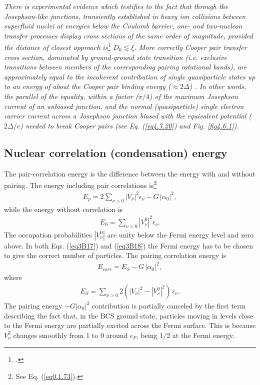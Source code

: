 \textit{There is experimental evidence which testifies to the fact that through the Josephson-like junctions, transiently established in heavy ion collisions between superfluid nuclei at energies below the Coulomb barrier, one- and two-nucleon transfer processes display cross sections of the same order of magnitude, provided the distance of closest approach is\footnote{\cite{Potel:20b}.} $D_0\lesssim\xi$.  More correctly Cooper pair transfer cross section, dominated by ground-ground state transition (i.e. exclusive transitions between members of the corresponding pairing rotational bands), are approximately equal to the incoherent contribution of single quasiparticle states up to an energy of about the Cooper pair binding energy ($\approx2\Delta$) . In other words, the parallel of the equality, within a factor ($\pi/4$) of the maximum Josephson current of an unbiased junction, and the normal (quasiparticle) single electron carrier current across a Josephson junction biased with the equivalent potential ($2\Delta/e$) needed to  break Cooper pairs (see Eq. (\ref{eq4.7.20}) and Fig. \ref{fig4.6.1}).} 
\subsection{Nuclear correlation (condensation) energy}\label{App3B4}
The pair-correlation energy is the difference between the energy with and without pairing. The energy including pair correlations is\footnote{See Eq. (\ref{eq0.1.73}).} 
 \begin{align}\label{eq3B17}
E_p=2\sum_{\nu>0}|V_\nu|^2\epsilon_\nu-G\,|\alpha_0|^2,
 \end{align} 
 while the energy without correlation is
  \begin{align}\label{eq3B18}
  E_0=\sum_{\nu>0}|V^0_\nu|^2\epsilon_\nu.
  \end{align} 
 The occupation probabilities $|V^0_\nu|$ are unity below the Fermi energy level and zero above. In both Eqs. (\ref{eq3B17}) and (\ref{eq3B18}) the Fermi energy has to be chosen to give the correct number of particles. The pairing correlation energy is 
   \begin{align}\label{eq3B19}
E_{corr}=E_S-G\,|\alpha_0|^2,
   \end{align} 
 where
   \begin{align}\label{eq3B20}
E_S=\sum_{\nu>0}2(|V_\nu|^2-|V^0_\nu|^2)\,\epsilon_\nu.
   \end{align}  
 The  pairing energy $-G|\alpha_0|^2$ contribution is partially canceled by the first term describing the fact that, in the BCS ground state, particles moving in levels close to the Fermi energy are partially excited across the Fermi surface. This is because $V_\nu^2$ changes smoothly from 1 to 0 around $\epsilon_F$, being 1/2 at the Fermi energy.
 
